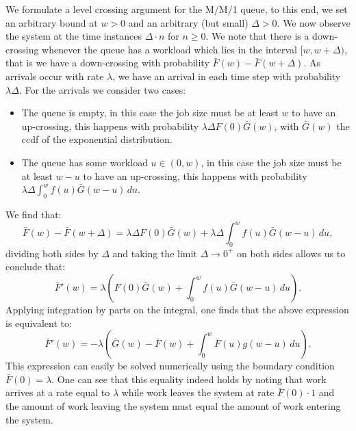 \documentclass[12pt]{report}
\begin{document}
\begin{appendices}
We formulate a level crossing argument for the M/M/1 queue, to this end, we set an arbitrary bound at $w > 0$ and an arbitrary (but small) $\Delta > 0$. We now observe the system at the time instances $\Delta \cdot n$ for $n \geq 0$. We note that there is a down-crossing whenever the queue has a workload which lies in the interval $[w,w+\Delta)$, that is we have a down-crossing with probability $\bar F(w) - \bar F(w+\Delta)$. As arrivals occur with rate $\lambda$, we have an arrival in each time step with probability $\lambda \Delta$. For the arrivals we consider two cases:
\begin{itemize}
\item The queue is empty, in this case the job size must be at least $w$ to have an up-crossing, this happens with probability $\lambda \Delta F(0) \bar G(w)$, with $\bar G(w)$ the ccdf of the exponential distribution.
\item The queue has some workload $u \in (0,w)$, in this case the job size must be at least $w-u$ to have an up-crossing, this happens with probability $\lambda \Delta \int_0^w f(u) \bar G(w-u) \, du$.
\end{itemize}
We find that:
$$
\bar F(w) - \bar F(w+\Delta) = \lambda \Delta F(0) \bar G(w) + \lambda \Delta \int_0^w f(u) \bar G(w-u) \, du,
$$
dividing both sides by $\Delta$ and taking the limit $\Delta \rightarrow 0^+$ on both sides allows us to conclude that:
$$
\bar F'(w) = \lambda \left( F(0) \bar G(w) + \int_0^w f(u) \bar G(w-u) \, du \right).
$$
Applying integration by parts on the integral, one finds that the above expression is equivalent to:
\begin{equation}\label{eq:MM1_DFbar}
\bar F'(w) = - \lambda \left( \bar G(w) - \bar F(w) + \int_0^w \bar F(u) g(w-u) \, du \right).
\end{equation}
This expression can easily be solved numerically using the boundary condition $\bar F(0)= \lambda$. One can see that this equality indeed holds by noting that work arrives at a rate equal to $\lambda$ while work leaves the system at rate $\bar F(0) \cdot 1$ and the amount of work leaving the system must equal the amount of work entering the system.


\end{appendices}
\end{document}
